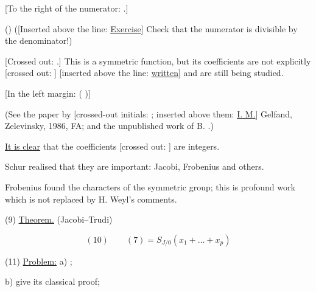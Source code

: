 [To the right of the numerator: .]

()
([Inserted above the line: \underline{Exercise}] Check that the numerator is divisible by the denominator!)

[Crossed out: .]
This is a symmetric function, but its coefficients are not explicitly
[crossed out: ]
[inserted above the line: \underline{written}]
and are still being studied.

[In the left margin: (
)]

(See the paper by [crossed-out initials:
;
inserted above them: \underline{I. M.}] Gelfand, Zelevinsky, 1986, FA;
and the unpublished work of B. .)

\underline{It is clear}  that the coefficients
[crossed out: ] are integers.

Schur realised that they are important:
Jacobi, Frobenius and others.



Frobenius found the characters of the symmetric group; this is profound work which
is not replaced by H. Weyl's comments.

(9) \underline{Theorem.} (Jacobi--Trudi)

\begin{equation*}
(10)\qquad (7)=S_{J/0}(x_1+\ldots+x_p)
\end{equation*}

(11) \underline{Problem:} a) ;

b) give its classical proof;

